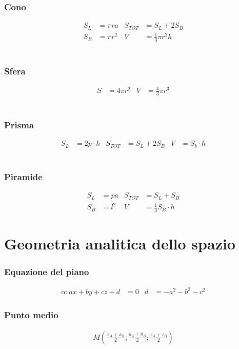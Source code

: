 \documentclass[a4paper]{article}
\begin{document}
	\subsubsection*{Cono}
	\begin{align*}
		S_L & = \pi r a & S_{TOT} & = S_L + 2S_B            \\
		S_B & = \pi r^2 & V       & = \frac{1}{3} \pi r^2 h
	\end{align*}
	\\
	\subsubsection*{Sfera}
	\begin{align*}
		S &= 4\pi r^2 & V &= \frac{4}{3} \pi r^3
	\end{align*}
	\\
	\subsubsection*{Prisma}
	\begin{align*}
		S_L &= 2p \cdot h	&	S_{TOT} &= S_L +2S_B
		&			V &= S_b \cdot h
	\end{align*}
	\\
	\subsubsection*{Piramide}
	\begin{align*}
		S_L &= pa	&	S_{TOT} &= S_L + S_B\\
		S_B &= l^2	&	V &= \frac{1}{3} S_B \cdot h
	\end{align*}
	
	\newpage
	\section{Geometria analitica dello spazio}

	\subsubsection*{Equazione del piano}
	\begin{align*}
		\alpha : ax +by +cz+ d &= 0			&			d &= -a^2-b^2-c^2
	\end{align*}

	\subsubsection*{Punto medio}
	\begin{align*}
		M \left( \frac{x_A + x_B}{2} ; \frac{y_A + y_B}{2} ; \frac{z_A + z_B}{2} \right)
	\end{align*}
\end{document}

